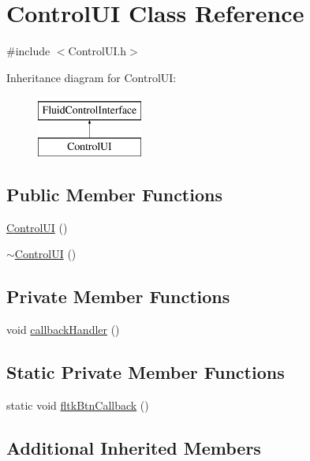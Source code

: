 \hypertarget{class_control_u_i}{}\section{Control\+UI Class Reference}
\label{class_control_u_i}


{\ttfamily \#include $<$Control\+U\+I.\+h$>$}

Inheritance diagram for Control\+UI\+:\begin{figure}[H]
\begin{center}
\leavevmode
\includegraphics[height=2.000000cm]{class_control_u_i}
\end{center}
\end{figure}
\subsection*{Public Member Functions}
\begin{DoxyCompactItemize}
\item 
\hyperlink{class_control_u_i_ad2a2837a3b055d166b0dfe209545046e}{Control\+UI} ()
\item 
\hyperlink{class_control_u_i_a65f2e6bca109cef29ba350ba2a1580f9}{$\sim$\+Control\+UI} ()
\end{DoxyCompactItemize}
\subsection*{Private Member Functions}
\begin{DoxyCompactItemize}
\item 
void \hyperlink{class_control_u_i_a951dd8a83c3b93b9231169c6eb33fa82}{callback\+Handler} ()
\end{DoxyCompactItemize}
\subsection*{Static Private Member Functions}
\begin{DoxyCompactItemize}
\item 
static void \hyperlink{class_control_u_i_ab72cd93a7844ff76187ddf77432ddafb}{fltk\+Btn\+Callback} ()
\end{DoxyCompactItemize}
\subsection*{Additional Inherited Members}


